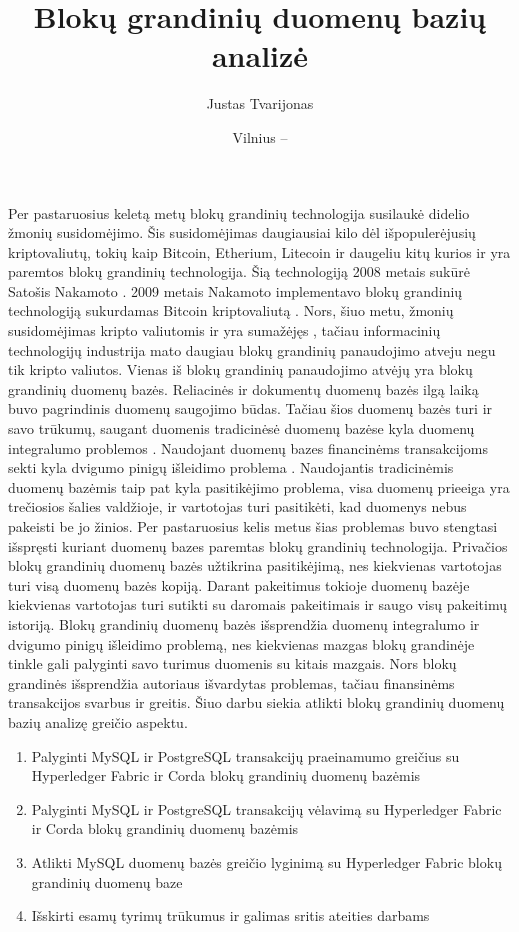 \documentclass{VUMIFPSkursinis}
\title{Blokų grandinių duomenų bazių analizė }
\author{Justas Tvarijonas}
\date{Vilnius – \the\year}
\begin{document}
\maketitle

\tableofcontents

Per pastaruosius keletą metų blokų grandinių technologija susilaukė didelio žmonių susidomėjimo. 
Šis susidomėjimas daugiausiai kilo dėl išpopulerėjusių kriptovaliutų, tokių kaip Bitcoin, Etherium, Litecoin ir daugeliu kitų 
kurios ir yra paremtos blokų grandinių technologija. Šią technologiją 2008 metais sukūrė Satošis Nakamoto  \cite{BlockChain}. 
2009 metais Nakamoto implementavo blokų grandinių technologiją sukurdamas Bitcoin kriptovaliutą \cite{Bitcoin}. 
Nors, šiuo metu, žmonių susidomėjimas kripto valiutomis ir yra sumažėjęs \cite{Trends}, tačiau informacinių technologijų industrija 
mato daugiau blokų grandinių panaudojimo atveju negu tik kripto valiutos. Vienas iš blokų grandinių panaudojimo atvėjų yra 
blokų grandinių duomenų bazės. Reliacinės ir dokumentų duomenų bazės ilgą laiką buvo pagrindinis duomenų saugojimo būdas. 
Tačiau šios duomenų bazės turi ir savo trūkumų, saugant duomenis tradicinėsė duomenų bazėse kyla duomenų integralumo problemos \cite{Integrity}
. 
Naudojant duomenų bazes financinėms transakcijoms sekti kyla dvigumo pinigų išleidimo problema\cite{Double}
. Naudojantis tradicinėmis duomenų bazėmis 
taip pat kyla pasitikėjimo problema, visa duomenų prieeiga yra trečiosios šalies valdžioje, ir vartotojas turi pasitikėti, kad duomenys nebus pakeisti be jo žinios.
Per pastaruosius kelis metus šias problemas
 buvo stengtasi išspręsti kuriant duomenų bazes paremtas blokų grandinių technologija. Privačios blokų grandinių duomenų bazės užtikrina pasitikėjimą, nes kiekvienas vartotojas turi visą duomenų 
bazės kopiją. Darant pakeitimus tokioje duomenų bazėje kiekvienas vartotojas turi sutikti su daromais pakeitimais ir saugo visų pakeitimų istoriją. Blokų grandinių duomenų bazės išsprendžia duomenų integralumo ir
dvigumo pinigų išleidimo problemą, nes kiekvienas mazgas blokų grandinėje tinkle gali palyginti savo turimus duomenis su kitais mazgais. 
Nors blokų grandinės išsprendžia autoriaus išvardytas problemas, tačiau finansinėms transakcijos svarbus ir greitis. Šiuo darbu siekia atlikti blokų grandinių duomenų bazių analizę greičio aspektu.

	\begin{enumerate}
		\item{Palyginti MySQL ir PostgreSQL transakcijų praeinamumo greičius su Hyperledger Fabric ir Corda blokų grandinių duomenų bazėmis}
		\item{Palyginti MySQL ir PostgreSQL transakcijų vėlavimą su Hyperledger Fabric ir Corda blokų grandinių duomenų bazėmis}
		\item{Atlikti MySQL duomenų bazės greičio lyginimą su Hyperledger Fabric blokų grandinių duomenų baze}
		\item{Išskirti esamų tyrimų trūkumus ir galimas sritis ateities darbams}
		
		
	\end{enumerate}
\pagebreak
\end{document}
